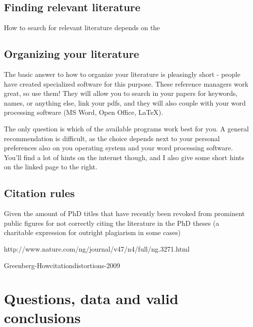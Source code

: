 \documentclass{tufte-book}
\begin{document}
\section{Finding relevant literature}

How to search for relevant literature depends on the


\section{Organizing your literature}

The basic answer to how to organize your literature is pleasingly short - people have created specialized software for this purpose. These reference managers work great, so use them! They will allow you to search in your papers for keywords, names, or anything else, link your pdfs, and they will also couple with your word processing software (MS Word, Open Office, LaTeX). 


The only question is which of the available programs work best for you. A general recommendation is difficult, as the choice depends next to your personal preferences also on you operating system and your word processing software. You'll find a lot of hints on the internet though, and I also give some short hints on the linked page to the right. 

\section{Citation rules}


Given the amount of PhD titles that have recently been revoked from prominent public figures for not correctly citing the literature in the PhD theses (a charitable expression for outright plagiarism in some cases)

http://www.nature.com/ng/journal/v47/n4/full/ng.3271.html

Greenberg-Howcitationdistortions-2009






\chapter{Questions, data and valid conclusions}
\end{document}
